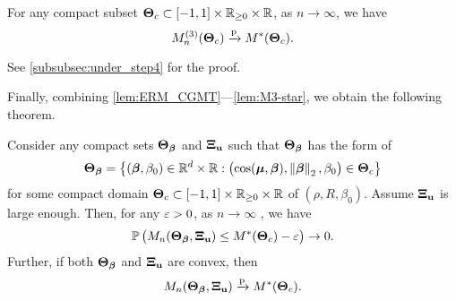 \begin{lem}\label{lem:M3-star}
    For any compact subset $\text{\boldmath $\Theta$}_{c} \subset [-1, 1] \times \mathbb{R}_{\ge 0} \times \mathbb{R}$, as $n \to \infty$, we have
    \begin{equation*}
        M_n^{(3)}(\text{\boldmath $\Theta$}_{c}) \xrightarrow{\mathrm{p}} M^{*}(\text{\boldmath $\Theta$}_{c}).
    \end{equation*}
\end{lem}
\noindent
See \cref{subsubsec:under_step4} for the proof.


\vspace{0.5\baselineskip}
Finally, combining \cref{lem:ERM_CGMT}---\ref{lem:M3-star}, we obtain the following theorem.
\begin{thm}
\label{thm:ERM_conv}
    Consider any compact sets $\text{\boldmath $\Theta$}_{{\boldsymbol{\beta}}}$ and $\text{\boldmath $\Xi$}_{\mathrm{\bf u}}$ such that $\text{\boldmath $\Theta$}_{{\boldsymbol{\beta}}}$ has the form of
    \begin{equation}\label{eq:Theta_link}
        \text{\boldmath $\Theta$}_{{\boldsymbol{\beta}}} = \left\{ 
        ({\boldsymbol{\beta}}, \beta_0) \in \mathbb{R}^{d} \times \mathbb{R}:
        \bigl( \cos({\boldsymbol{\mu}}, {\boldsymbol{\beta}}), \left\|{{\boldsymbol{\beta}}}\right\|_2, \beta_0 \bigr) \in \text{\boldmath $\Theta$}_{c}
        \right\}
    \end{equation}
    for some compact domain $\text{\boldmath $\Theta$}_{c} \subset [-1, 1] \times \mathbb{R}_{\ge 0} \times \mathbb{R}$ of $(\rho, R, \beta_0)$. Assume $\text{\boldmath $\Xi$}_{\mathrm{\bf u}}$ is large enough. Then, for any $\varepsilon > 0$, as $n \to \infty$ , we have
    \begin{equation*}
        \mathbb{P} \, \bigl( M_n(\text{\boldmath $\Theta$}_{{\boldsymbol{\beta}}}, \text{\boldmath $\Xi$}_{\mathrm{\bf u}}) \le M^*(\text{\boldmath $\Theta$}_{c}) - \varepsilon \bigr) \to 0.
    \end{equation*}
    Further, if both $\text{\boldmath $\Theta$}_{{\boldsymbol{\beta}}}$ and $\text{\boldmath $\Xi$}_{\mathrm{\bf u}}$ are convex, then
    \begin{equation*}
        M_n(\text{\boldmath $\Theta$}_{{\boldsymbol{\beta}}}, \text{\boldmath $\Xi$}_{\mathrm{\bf u}}) \xrightarrow{\mathrm{p}} M^*(\text{\boldmath $\Theta$}_{c}).
    \end{equation*}
\end{thm}
